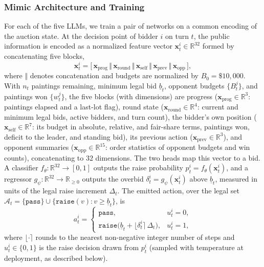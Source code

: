 \subsubsection{Mimic Architecture and Training}
For each of the five LLMs, we train a pair of networks on a common encoding of the auction state. At the decision point of bidder $i$ on turn $t$, the public information is encoded as a normalized feature vector $\mathbf{x}^i_t \in \mathbb{R}^{32}$ formed by concatenating five blocks,
\begin{equation}
\mathbf{x}^i_t = \big[\, \mathbf{x}_{\mathrm{prog}} \,\Vert\, \mathbf{x}_{\mathrm{round}} \,\Vert\, \mathbf{x}_{\mathrm{self}} \,\Vert\, \mathbf{x}_{\mathrm{prev}} \,\Vert\, \mathbf{x}_{\mathrm{opp}} \,\big],
\end{equation}
where $\Vert$ denotes concatenation and budgets are normalized by $B_0 = \$10{,}000$. With $n_t$ paintings remaining, minimum legal bid $\underline{b}_t$, opponent budgets $\{B^j_t\}$, and paintings won $\{w^j_t\}$, the five blocks (with dimensions) are progress ($\mathbf{x}_{\mathrm{prog}}\in\mathbb{R}^{3}$: paintings elapsed and a last-lot flag), round state ($\mathbf{x}_{\mathrm{round}}\in\mathbb{R}^{4}$: current and minimum legal bids, active bidders, and turn count), the bidder's own position ($\mathbf{x}_{\mathrm{self}}\in\mathbb{R}^{7}$: its budget in absolute, relative, and fair-share terms, paintings won, deficit to the leader, and standing bid), its previous action ($\mathbf{x}_{\mathrm{prev}}\in\mathbb{R}^{3}$), and opponent summaries ($\mathbf{x}_{\mathrm{opp}}\in\mathbb{R}^{15}$: order statistics of opponent budgets and win counts), concatenating to $32$ dimensions.
The two heads map this vector to a bid. A classifier $f_\theta : \mathbb{R}^{32} \to [0,1]$ outputs the raise probability $p^i_t = f_\theta(\mathbf{x}^i_t)$, and a regressor $g_\psi : \mathbb{R}^{32} \to \mathbb{R}_{\ge 0}$ outputs the overbid $\delta^i_t = g_\psi(\mathbf{x}^i_t)$ above $\underline{b}_t$, measured in units of the legal raise increment $\Delta_t$. The emitted action, over the legal set $\mathcal{A}_t = \{\texttt{pass}\} \cup \{\texttt{raise}(v) : v \ge \underline{b}_t\}$, is
\begin{equation}
a^i_t =
\begin{cases}
\texttt{pass}, & u^i_t = 0,\\[2pt]
\texttt{raise}\big(\underline{b}_t + \lfloor \delta^i_t \rceil\, \Delta_t\big), & u^i_t = 1,
\end{cases}
\end{equation}
where $\lfloor\cdot\rceil$ rounds to the nearest non-negative integer number of steps and $u^i_t \in \{0,1\}$ is the raise decision drawn from $p^i_t$ (sampled with temperature at deployment, as described below).

